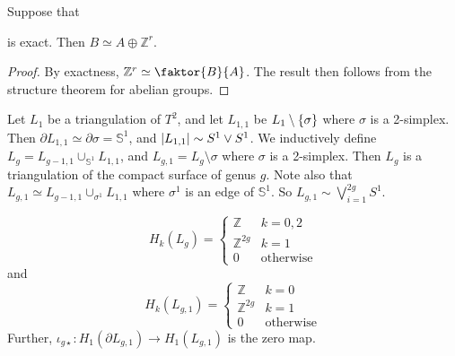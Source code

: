\begin{proposition}
	Suppose that
	is exact.
	Then \( B \simeq A \oplus \mathbb Z^r \).
\end{proposition}
\begin{proof}
	By exactness, \( \mathbb Z^r \simeq \faktor{B}{A} \).
	The result then follows from the structure theorem for abelian groups.
\end{proof}
\begin{example}
	Let \( L_1 \) be a triangulation of \( T^2 \), and let \( L_{1,1} \) be \( L_1 \setminus \qty{\sigma} \) where \( \sigma \) is a 2-simplex.
	Then \( \partial L_{1,1} \simeq \partial \sigma = \mathbb S^1 \), and \( \abs{L_{1,1}} \sim S^1 \vee S^1 \).
	We inductively define \( L_g = L_{g-1,1} \cup_{\mathbb S^1} L_{1,1} \), and \( L_{g,1} = L_g \setminus \sigma \) where \( \sigma \) is a 2-simplex.
	Then \( L_g \) is a triangulation of the compact surface of genus \( g \).
	Note also that \( L_{g,1} \simeq L_{g-1,1} \cup_{\sigma^1} L_{1,1} \) where \( \sigma^1 \) is an edge of \( \mathbb S^1 \).
	So \( L_{g,1} \sim \bigvee_{i=1}^{2g} S^1 \).
\end{example}
\begin{proposition}
	\[ H_k(L_g) = \begin{cases}
		\mathbb Z & k = 0, 2 \\
		\mathbb Z^{2g} & k = 1 \\
		0 & \text{otherwise}
	\end{cases} \]
	and
	\[ H_k(L_{g,1}) = \begin{cases}
		\mathbb Z & k = 0 \\
		\mathbb Z^{2g} & k = 1 \\
		0 & \text{otherwise}
	\end{cases} \]
	Further, \( \iota_{g\star} \colon H_1(\partial L_{g,1}) \to H_1(L_{g,1}) \) is the zero map.
\end{proposition}
